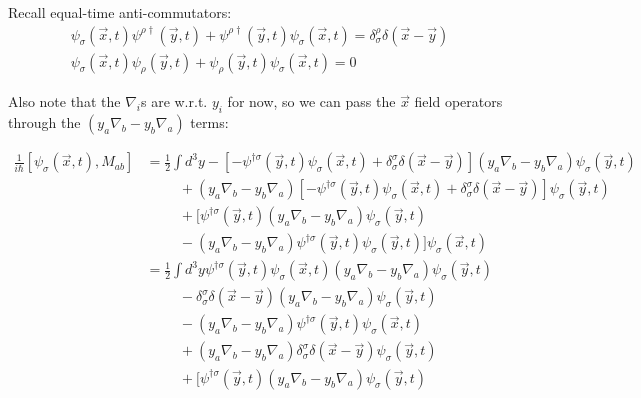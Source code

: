 Recall equal-time anti-commutators: 
\begin{align*}
    \psi_\sigma(\vec{x},t)\psi^{\rho\dagger}(\vec{y},t) + \psi^{\rho\dagger}(\vec{y},t)\psi_\sigma(\vec{x},t) = \delta_\sigma^\rho \delta(\vec{x}-\vec{y})\\
    \psi_\sigma(\vec{x},t)\psi_{\rho}(\vec{y},t) + \psi_{\rho}(\vec{y},t)\psi_\sigma(\vec{x},t) = 0
\end{align*}

Also note that the $\nabla_i$s are w.r.t. $y_i$ for now, so we can pass the $\vec{x}$ field operators through the $(y_a\nabla_b - y_b\nabla_a)$ terms:

\begin{align*}
    \frac{1}{i\hbar}[\psi_\sigma(\vec{x},t), M_{ab}] 
    &= \frac{1}{2}\int d^3y -[-\psi^{\dagger\sigma}(\vec{y},t)\psi_\sigma(\vec{x},t) + \delta_\sigma^\sigma \delta(\vec{x}-\vec{y})](y_a \nabla_b - y_b \nabla_a)\psi_{\sigma}(\vec{y},t) \\
    &\hspace{1cm}+(y_a \nabla_b - y_b \nabla_a)[-\psi^{\dagger\sigma}(\vec{y},t)\psi_\sigma(\vec{x},t) + \delta_\sigma^\sigma \delta(\vec{x}-\vec{y})]\psi_{\sigma}(\vec{y},t) \\
    &\hspace{1cm}+[\psi^{\dagger\sigma}(\vec{y},t)(y_a \nabla_b - y_b \nabla_a)\psi_{\sigma}(\vec{y},t) \\
    &\hspace{1cm}-(y_a \nabla_b - y_b \nabla_a)\psi^{\dagger\sigma}(\vec{y},t)\psi_{\sigma}(\vec{y},t)]\psi_\sigma(\vec{x},t) \\
    &= \frac{1}{2}\int d^3y 
    \psi^{\dagger\sigma}(\vec{y},t)\psi_\sigma(\vec{x},t)(y_a \nabla_b - y_b \nabla_a)\psi_{\sigma}(\vec{y},t)\\
    &\hspace{1cm}- \delta_\sigma^\sigma \delta(\vec{x}-\vec{y})(y_a \nabla_b - y_b \nabla_a)\psi_{\sigma}(\vec{y},t) \\
    &\hspace{1cm}-(y_a \nabla_b - y_b \nabla_a)\psi^{\dagger\sigma}(\vec{y},t)\psi_\sigma(\vec{x},t)\\
    &\hspace{1cm}+ (y_a \nabla_b - y_b \nabla_a)\delta_\sigma^\sigma \delta(\vec{x}-\vec{y})\psi_{\sigma}(\vec{y},t) \\
    &\hspace{1cm}+[\psi^{\dagger\sigma}(\vec{y},t)(y_a \nabla_b - y_b \nabla_a)\psi_{\sigma}(\vec{y},t) \\

\end{align*}
